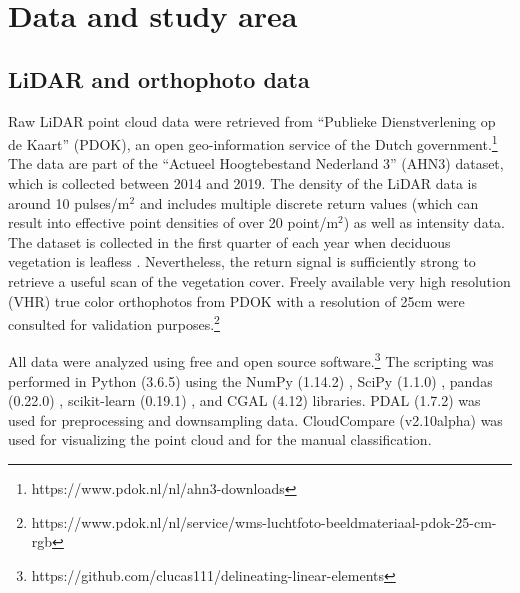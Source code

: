 \section{Data and study area}
\subsection{LiDAR and orthophoto data}
Raw LiDAR point cloud data were retrieved from ``Publieke Dienstverlening op de Kaart'' (PDOK), an open geo-information service of the Dutch government.\footnote{https://www.pdok.nl/nl/ahn3-downloads} The data are part of the ``Actueel Hoogtebestand Nederland 3'' (AHN3) dataset, which is collected between 2014 and 2019. The density of the LiDAR data is around 10 pulses/m$^2$ and includes multiple discrete return values (which can result into effective point densities of over 20 point/m$^2$) as well as intensity data. The dataset is collected in the first quarter of each year when deciduous vegetation is leafless \citep{AHN2016inwinjaren}. Nevertheless, the return signal is sufficiently strong to retrieve a useful scan of the vegetation cover. Freely available very high resolution (VHR) true color orthophotos from PDOK with a resolution of 25cm were consulted for validation purposes.\footnote{https://www.pdok.nl/nl/service/wms-luchtfoto-beeldmateriaal-pdok-25-cm-rgb}

All data were analyzed using free and open source software.\footnote{https://github.com/clucas111/delineating-linear-elements} The scripting was performed in Python (3.6.5) using the NumPy (1.14.2) \citep{walt2011numpy}, SciPy (1.1.0) \citep{jones2001scipy}, pandas (0.22.0) \citep{mckinney2010data}, scikit-learn (0.19.1) \citep{pedregosa2011scikit}, and CGAL (4.12) \citep{cgal2018} libraries. PDAL (1.7.2) \citep{pdal2018} was used for preprocessing and downsampling data. CloudCompare (v2.10alpha) \citep{cloudcompare2018} was used for visualizing the point cloud and for the manual classification.

